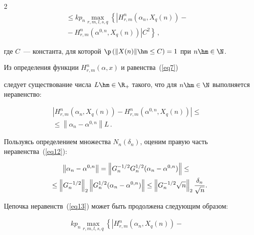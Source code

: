 \begin{multicols}{2}
\begin{multline}
{}\leq kp_n\max\limits_{r,m,l,s,q}\left\{\left|H^n_{r,m}(\alpha_n, X_q(n))-{}\right.\right.\\


\left.\left.{}-H^n_{r,m} (\alpha^{0,n}, X_q(n))\right|C^2\right\}\,,


\label{eq13}


\end{multline}


где $C$~--- константа, для которой $\p\left(\|X(n)\|\hm\leq C\right)=1$ при $n\hm\in\N$. 


Из определения функции $H^n_{r,m}(\alpha,x)$ и равенства~(\ref{eq7}) 


следует существование числа $L\hm\in\R_+$ такого, что для $n\hm\in\N$ выполняется неравенство:


\begin{multline}


\left|H^n_{r,m}(\alpha_n, X_q(n))-H^n_{r,m}(\alpha^{0,n}, X_q(n))\right|\leq{}\\


{}\leq


\left\|\alpha_n-\alpha^{0,n}\right\|L\,.\label{eq12}


\end{multline}





Пользуясь определением множества $N_n(\delta_n)$, оценим правую часть неравенства~(\ref{eq12}):


\begin{multline*}


\left\|\alpha_n-\alpha^{0,n}\right\|=\left\|G_n^{-1/2}G_n^{1/2}(\alpha_n-\alpha^{0,n})\right\|\leq{}\\


\!{}\leq\left\|G_n^{-1/2}\right\|_2\left\|G_n^{1/2}(\alpha_n-\alpha^{0,n})\right\|\leq \left\|G_n^{-1/2}\sqrt{n}\right\|_2\frac{\delta_n}{\sqrt{n}}.\hspace*{-7.18407pt}


\end{multline*}





Цепочка неравенств~(\ref{eq13}) может быть продолжена следующим образом:


\begin{multline}


kp_n \max\limits_{r,m,l,s,q}\left\{\left|H^n_{r,m}(\alpha_n, X_q(n))-{}\right.\right.\\



\end{multline}
\end{multicols}
